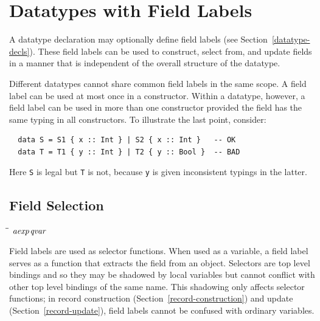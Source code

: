 \section{Datatypes with Field Labels}
\label{field-ops}
A datatype declaration may optionally define field labels
(see Section~\ref{datatype-decls}).
These field labels can be used to 
construct, select from, and update fields in a manner
that is independent of the overall structure of the datatype.

Different datatypes cannot share common field labels in the same scope.
A field label can be used at most once in a constructor.
Within a datatype, however, a field label can be used in more
than one constructor provided the field has the same typing in all
constructors. To illustrate the last point, consider:
\bprog
{\small\begin{verbatim}
  data S = S1 { x :: Int } | S2 { x :: Int }   -- OK
  data T = T1 { y :: Int } | T2 { y :: Bool }  -- BAD
\end{verbatim}}
\eprog
Here \mbox{\tt S} is legal but \mbox{\tt T} is not, because \mbox{\tt y} is given 
inconsistent typings in the latter.

\subsection{Field Selection}
\begin{flushleft}\it\begin{tabbing}
\hspace{0.6in}\=\hspace{3.1in}\=\kill
$\it aexp$\>\makebox[3.5em]{$\rightarrow$}$\it qvar$
\end{tabbing}\end{flushleft}

Field labels are used as selector functions.  When used as a variable,
a field label serves as a function that extracts the field from an
object.  Selectors are top level bindings and so they
may be shadowed by local variables but cannot conflict with 
other top level bindings of the same name.  This shadowing only
affects selector functions; in record construction (Section~\ref{record-construction}) 
and update (Section~\ref{record-update}), field labels
cannot be confused with ordinary variables. 

